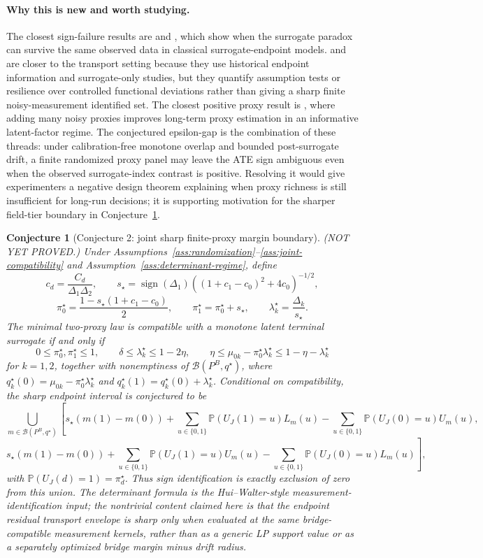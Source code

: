 \documentclass[11pt]{article}
\renewcommand{\Pr}{\mathbb{P}}
\theoremstyle{definition}
\theoremstyle{plain}
\newtheorem{conjecture}{Conjecture}
\theoremstyle{remark}
\begin{document}
\paragraph{Why this is new and worth studying.}
The closest sign-failure results are \citet{ChenGengJia2007} and \citet{YinLiuGengLuo2020}, which show when the surrogate paradox can survive the same observed data in classical surrogate-endpoint models.  \citet{HsiaoTianParast2025} and \citet{HsiaoParast2026} are closer to the transport setting because they use historical endpoint information and surrogate-only studies, but they quantify assumption tests or resilience over controlled functional deviations rather than giving a sharp finite noisy-measurement identified set.  The closest positive proxy result is \citet{LalImbensHull2026}, where adding many noisy proxies improves long-term proxy estimation in an informative latent-factor regime.  The conjectured epsilon-gap is the combination of these threads: under calibration-free monotone overlap and bounded post-surrogate drift, a finite randomized proxy panel may leave the ATE sign ambiguous even when the observed surrogate-index contrast is positive.  Resolving it would give experimenters a negative design theorem explaining when proxy richness is still insufficient for long-run decisions; it is supporting motivation for the sharper field-tier boundary in Conjecture~\ref{conj:sharp-margin}.

\begin{conjecture}[Conjecture 2: joint sharp finite-proxy margin boundary]\label{conj:sharp-margin}
(NOT YET PROVED.)  Under Assumptions~\ref{ass:randomization}--\ref{ass:joint-compatibility} and Assumption~\ref{ass:determinant-regime}, define
\[
  c_d=\frac{C_d}{\Delta_1\Delta_2},\qquad
  s_\star=\operatorname{sign}(\Delta_1)\left((1+c_1-c_0)^2+4c_0\right)^{-1/2},
\]
\[
  \pi_0^\star=\frac{1-s_\star(1+c_1-c_0)}{2},\qquad
  \pi_1^\star=\pi_0^\star+s_\star,\qquad
  \lambda_k^\star=\frac{\Delta_k}{s_\star}.
\]
The minimal two-proxy law is compatible with a monotone latent terminal surrogate if and only if
\[
  0\le \pi_0^\star,\pi_1^\star\le1,\qquad
  \delta\le \lambda_k^\star\le 1-2\eta,\qquad
  \eta\le \mu_{0k}-\pi_0^\star\lambda_k^\star\le1-\eta-\lambda_k^\star
\]
for \(k=1,2\), together with nonemptiness of \(\mathcal{B}(P^B,q^\star)\), where \(q_k^\star(0)=\mu_{0k}-\pi_0^\star\lambda_k^\star\) and \(q_k^\star(1)=q_k^\star(0)+\lambda_k^\star\).  Conditional on compatibility, the sharp endpoint interval is conjectured to be
\[
  \bigcup_{m\in\mathcal{B}(P^B,q^\star)}
  \left[
  s_\star(m(1)-m(0))+
  \sum_{u\in\{0,1\}}\Pr(U_J(1)=u)L_m(u)-
  \sum_{u\in\{0,1\}}\Pr(U_J(0)=u)U_m(u),
  \right.
\]
\[
\left.
  s_\star(m(1)-m(0))+
  \sum_{u\in\{0,1\}}\Pr(U_J(1)=u)U_m(u)-
  \sum_{u\in\{0,1\}}\Pr(U_J(0)=u)L_m(u)
  \right],
\]
with \(\Pr(U_J(d)=1)=\pi_d^\star\).  Thus sign identification is exactly exclusion of zero from this union.  The determinant formula is the Hui--Walter-style measurement-identification input; the nontrivial content claimed here is that the endpoint residual transport envelope is sharp only when evaluated at the same bridge-compatible measurement kernels, rather than as a generic LP support value or as a separately optimized bridge margin minus drift radius.
\end{conjecture}
\end{document}
